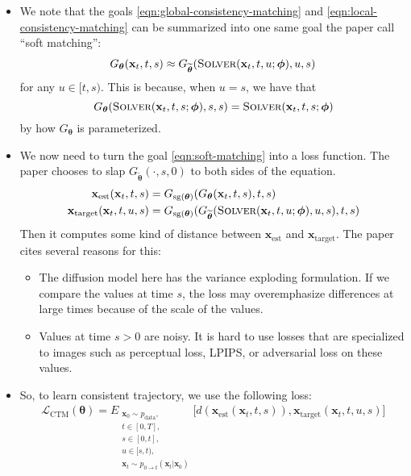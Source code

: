 \documentclass[10pt]{article}
\newcommand{\ve}[1]{\mathbf{#1}}
\newcommand{\ves}[1]{\boldsymbol{#1}}
\newcommand{\mrm}[1]{\mathrm{#1}}
\newcommand{\mcal}[1]{\mathcal{#1}}
\newcommand{\data}{\mathrm{data}}
\begin{document}
\begin{itemize}
  \item We note that the goals \eqref{eqn:global-consistency-matching} and \eqref{eqn:local-consistency-matching} can be summarized into one same goal the paper call ``soft matching'':
  \begin{align}
    G_{\ves{\theta}}(\ve{x}_t, t, s) \approx G_{\widetilde{\ves{\theta}}}(\textsc{Solver}(\ve{x}_t, t, u; \ves{\phi}), u, s) \label{eqn:soft-matching}
  \end{align}
  for any $u \in [t,s)$. This is because, when $u = s$, we have that $$G_{\ves{\theta}}(\textsc{Solver}(\ve{x}_t, t, s; \ves{\phi}), s, s) = \textsc{Solver}(\ve{x}_t, t, s; \ves{\phi})$$ by how $G_{\ves{\theta}}$ is parameterized.

  \item We now need to turn the goal \eqref{eqn:soft-matching} into a loss function. The paper chooses to slap $G_{\widetilde{\ves{\theta}}}(\cdot, s, 0)$ to both sides of the equation.
  \begin{align*}
    \ve{x}_{\mrm{est}}(\ve{x}_t, t, s) &= G_{\mrm{sg}(\ves{\theta})}(G_{\ves{\theta}}(\ve{x}_t, t, s), t, s) \\
    \ve{x}_{\mrm{target}}(\ve{x}_t, t, u, s) &= G_{\mrm{sg}(\ves{\theta})}(G_{\widetilde{\ves{\theta}}}(\textsc{Solver}(\ve{x}_t, t, u; \ves{\phi}), u, s), t, s) \\
  \end{align*}
  Then it computes some kind of distance between $\ve{x}_{\mrm{est}}$ and $\ve{x}_{\mrm{target}}$. The paper cites several reasons for this:
  \begin{itemize}
    \item The diffusion model here has the variance exploding formulation. If we compare the values at time $s$, the loss may overemphasize differences at large times because of the scale of the values.
    
    \item Values at time $s > 0$ are noisy. It is hard to use losses that are specialized to images such as perceptual loss, LPIPS, or adversarial loss on these values.    
  \end{itemize}

  \item So, to learn consistent trajectory, we use the following loss:
  \begin{align*}
    \mcal{L}_{\mrm{CTM}}(\ves{\theta}) = E_{\substack{\ve{x}_0 \sim p_{\data}, \\ t \in [0,T], \\ s \in [0,t], \\ u \in [s,t), \\ \ve{x}_t \sim p_{0 \rightarrow t}(\ve{x}_t|\ve{x}_0) }} \big[ d(\ve{x}_{\mrm{est}}(\ve{x}_t, t, s)), \ve{x}_{\mrm{target}}(\ve{x}_t, t, u, s) \big]
  \end{align*}


\end{itemize}
\end{document}
